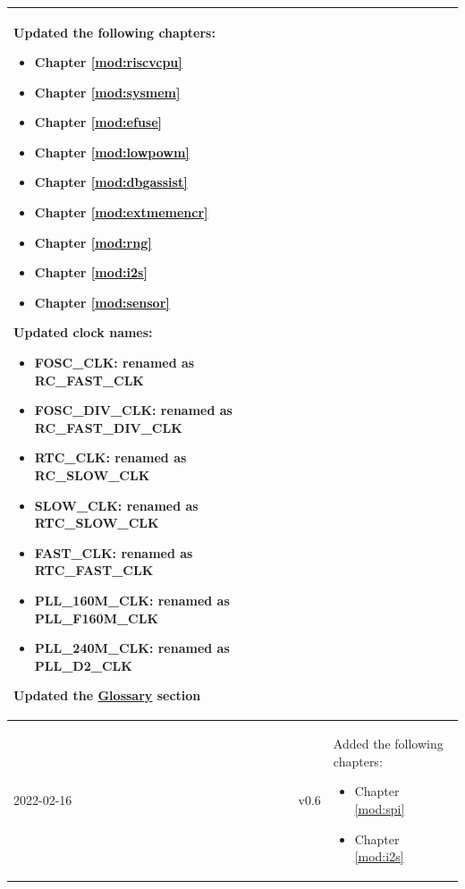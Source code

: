 \begin{longtable}[l]{ | m{2cm} | m{1.5cm} | m{12cm} | }
        Updated the following chapters:
            \begin{itemize}
                \item Chapter \ref{mod:riscvcpu} \textit{\nameref{mod:riscvcpu}}
                \item Chapter \ref{mod:sysmem} \textit{\nameref{mod:sysmem}}
                \item Chapter \ref{mod:efuse} \textit{\nameref{mod:efuse}}
                \item Chapter \ref{mod:lowpowm} \textit{\nameref{mod:lowpowm}}
                \item Chapter \ref{mod:dbgassist} \textit{\nameref{mod:dbgassist}}
                \item Chapter \ref{mod:extmemencr} \textit{\nameref{mod:extmemencr}}
                \item Chapter \ref{mod:rng} \textit{\nameref{mod:rng}}
                \item Chapter \ref{mod:i2s} \textit{\nameref{mod:i2s}}
                \item Chapter \ref{mod:sensor} \textit{\nameref{mod:sensor}}
            \end{itemize}
        Updated clock names:
        \begin{itemize}
        \item FOSC\_CLK: renamed as RC\_FAST\_CLK
        \item FOSC\_DIV\_CLK: renamed as RC\_FAST\_DIV\_CLK
        \item RTC\_CLK: renamed as RC\_SLOW\_CLK
        \item SLOW\_CLK: renamed as RTC\_SLOW\_CLK
        \item FAST\_CLK: renamed as RTC\_FAST\_CLK
        \item PLL\_160M\_CLK: renamed as PLL\_F160M\_CLK
        \item PLL\_240M\_CLK: renamed as PLL\_D2\_CLK%
        \end{itemize}
        Updated the \hyperref[glossary]{Glossary} section
\\\hline
    2022-02-16      & v0.6 &
        Added the following chapters:
            \begin{itemize}
                \item Chapter \ref{mod:spi} \textit{\nameref{mod:spi}}
                \item Chapter \ref{mod:i2s} \textit{\nameref{mod:i2s}}
            \end{itemize} \\\hline

\end{longtable}
